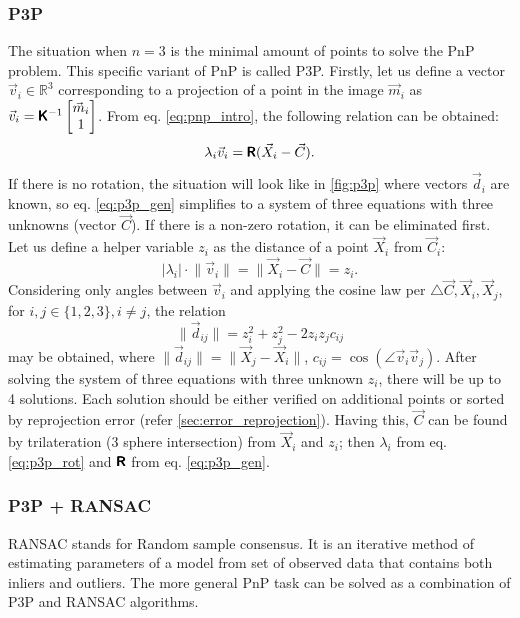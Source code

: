 \subsubsection{P3P}
The situation when $n=3$ is the minimal amount of points to solve the PnP problem.
This specific variant of PnP is called P3P.  
Firstly, let us define a vector $\vec{v}_i \in \mathbb{R}^3$ corresponding to a projection of a point in the image $\vec{m}_i$ as $\vec{v}_i = \pmb{\mathsf{K}}^{-1}\begin{bmatrix}\vec{m}_i \\ 1 \end{bmatrix}$. From eq. \eqref{eq:pnp_intro}, the following relation can be obtained:
\begin{equation}
    \label{eq:p3p_gen}
    \lambda_i \vec{v}_i = \pmb{\mathsf{R}} (\vec{X}_i - \vec{C}).
\end{equation}
If there is no rotation, the situation will look like in \autoref{fig:p3p} where vectors $\vec{d}_i$ are known, so eq. \eqref{eq:p3p_gen} simplifies to a system of three equations with three unknowns (vector $\vec{C}$).
If there is a non-zero rotation, it can be eliminated first.
Let us define a helper variable $z_i$ as the distance of a point $\vec{X}_i$ from $\vec{C}_i$:
\begin{equation}
    \label{eq:p3p_rot}
    |\lambda_i| \cdot \lVert \vec{v}_i \rVert = \lVert \vec{X}_i - \vec{C} \rVert = z_i.
\end{equation}
Considering only angles between $\vec{v}_i$ and applying the cosine law per $\triangle{\vec{C}, \vec{X}_i, \vec{X}_j}$, for $i, j \in \{1, 2, 3\}, i \neq j$, the relation
\begin{equation}
    \lVert \vec{d}_{ij} \rVert = z_i^2 + z_j^2 - 2z_iz_jc_{ij}
\end{equation}
may be obtained, where $\lVert \vec{d}_{ij} \rVert = \lVert \vec{X}_j - \vec{X}_i \rVert$, $c_{ij} = \cos(\angle \vec{v}_i \vec{v}_j)$.
After solving the system of three equations with three unknown $z_i$, there will be up to 4 solutions.
Each solution should be either verified on additional points \cite{Fischler1981} or sorted by reprojection error (refer \autoref{sec:error_reprojection}).
Having this, $\vec{C}$ can be found by trilateration (3 sphere intersection) from $\vec{X}_i$ and $z_i$; then $\lambda_i$ from eq. \eqref{eq:p3p_rot} and $\pmb{\mathsf{R}}$ from eq. \eqref{eq:p3p_gen}.

\subsubsection{P3P + RANSAC}
RANSAC stands for Random sample consensus. 
It is an iterative method of estimating parameters of a model from set of observed data that contains both inliers and outliers.
The more general PnP task can be solved as a combination of P3P and RANSAC algorithms.

